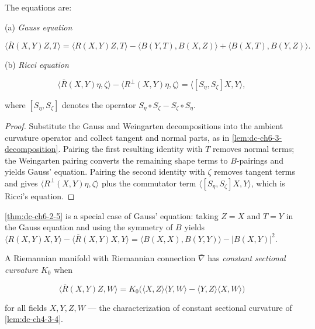 \begin{proposition}
  \label{prop:dc-ch6-3-1}
  \leanok
  The equations are:
  
  (a) \emph{Gauss equation}
  
  $$
  \langle\overline{R}(X,Y)Z,T\rangle=\langle R(X,Y)Z,T\rangle-\langle B(Y,T),B(X,Z)\rangle+\langle B(X,T),B(Y,Z)\rangle.
  $$
  
  (b) \emph{Ricci equation}
  
  $$
  \langle\overline{R}(X,Y)\eta,\zeta\rangle-\langle R^\perp(X,Y)\eta,\zeta\rangle=\langle[S_\eta,S_\zeta]X,Y\rangle,
  $$
  
  where $[S_\eta,S_\zeta]$ denotes the operator $S_\eta\circ S_\zeta-S_\zeta\circ S_\eta$.
\end{proposition}
\begin{proof}
  \leanok
  \sketch
  Substitute the Gauss and Weingarten decompositions into the ambient curvature
  operator and collect tangent and normal parts, as in
  \cref{lem:dc-ch6-3-decomposition}. Pairing the first resulting identity with
  $T$ removes normal terms; the Weingarten pairing converts the remaining shape
  terms to $B$-pairings and yields Gauss' equation. Pairing the second identity
  with $\zeta$ removes tangent terms and gives
  $\langle R^\perp(X,Y)\eta,\zeta\rangle$ plus the commutator term
  $\langle[S_\eta,S_\zeta]X,Y\rangle$, which is Ricci's equation.
\end{proof}

\begin{remark}
  \label{rem:dc-ch6-3-2}
  \leanok
  \cref{thm:dc-ch6-2-5} is a special case of Gauss' equation:
  taking $Z=X$ and $T=Y$ in the Gauss equation and using the symmetry of $B$
  yields $\langle R(X,Y)X,Y\rangle-\langle\overline{R}(X,Y)X,Y\rangle
  =\langle B(X,X),B(Y,Y)\rangle-|B(X,Y)|^2$.
\end{remark}

\begin{definition}
  \label{def:dc-ch6-3-constant-curvature}
  \leanok
  A Riemannian manifold with Riemannian connection $\overline{\nabla}$ has
  \emph{constant sectional curvature} $K_0$ when

  $$
  \langle\overline{R}(X,Y)Z,W\rangle=K_0\big(\langle X,Z\rangle\langle Y,W\rangle-\langle Y,Z\rangle\langle X,W\rangle\big)
  $$

  for all fields $X,Y,Z,W$ — the characterization of constant sectional
  curvature of \cref{lem:dc-ch4-3-4}.
\end{definition}

